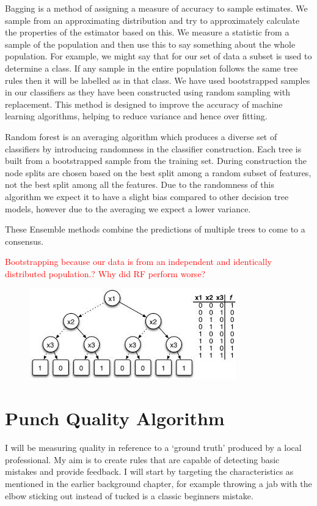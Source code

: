 Bagging is a method of assigning a measure of accuracy to sample estimates. We sample from an approximating distribution and try to approximately calculate the
properties of the estimator based on this. We measure a statistic from a sample of the population and then use this to say something about the whole population. For example, we might say that for our set of data a subset is used to determine a class. If any sample in the entire population follows the same tree rules then it will be labelled as in that class. We have used bootstrapped samples in our classifiers as they have been constructed using random sampling with replacement. 
This method is designed to improve the accuracy of machine learning algorithms, helping to reduce variance and hence over fitting. 

Random forest is an averaging algorithm which produces a diverse set of classifiers by introducing randomness in the classifier construction. Each tree is built from a bootstrapped sample from the training set. During construction the node splits are chosen based on the best split among a random subset of features, not the best split among all the features. Due to the randomness of this algorithm we expect it to have a slight bias compared to other decision tree
models, however due to the averaging we expect a lower variance.

These Ensemble methods combine the predictions of multiple trees to come to a consensus.



\textcolor{red}{Bootstrapping because our data is from an independent and identically distributed
population.?}
\textcolor{red}{Why did RF perform worse?}
 


\begin{figure}[h]
    \centering
    \includegraphics[height=0.25\textheight]{fig03/dtree}
    \label{fig:kinect}
\end{figure}


\section{Punch Quality Algorithm}
I will be measuring quality in reference to a `ground truth' produced by a local professional. My aim is to create rules that are capable of detecting basic mistakes and provide feedback. I will start by targeting the characteristics as mentioned in the earlier background chapter, for example 
throwing a jab with the elbow sticking out instead of tucked is a classic beginners mistake.


